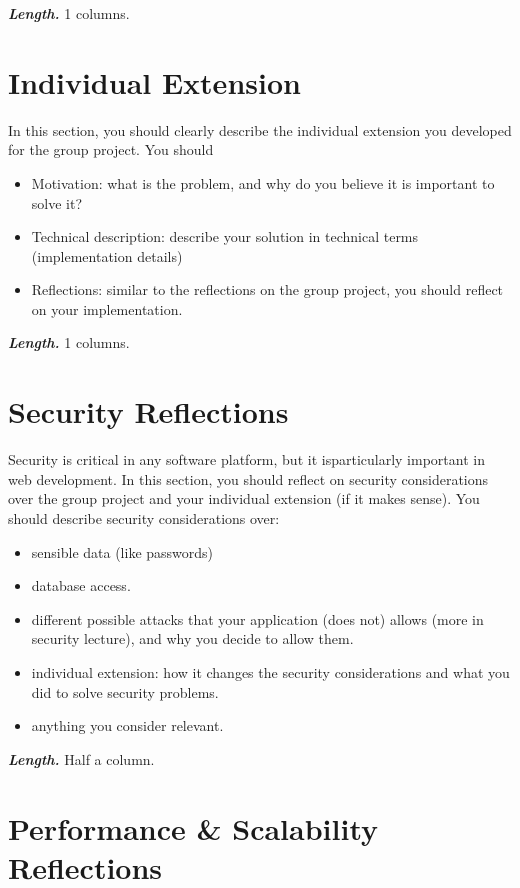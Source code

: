 \documentclass[letterpaper,twocolumn]{article}
\newcommand{\myparagraph}[1]{\vspace{0.1cm}\noindent \textbf{\textit{#1.}}}
\begin{document}
\myparagraph{Length} 1 columns.

\section{Individual Extension}
In this section, you should clearly describe the individual extension you developed for the group project. 
You should
\begin{itemize}
    \item Motivation: what is the problem, and why do you believe it is important to solve it?
    \item Technical description: describe your solution in technical terms (implementation details)
    \item Reflections: similar to the reflections on the group project, you should reflect on your implementation.
\end{itemize}

\myparagraph{Length} 1 columns.

\section{Security Reflections}
Security is critical in any software platform, but it isparticularly important in web development. 
In this section, you should reflect on security considerations over the group project and your individual extension (if it makes sense). 
You should describe security considerations over:

\begin{itemize}
    \item sensible data (like passwords)
    \item database access.
    \item different possible attacks that your application (does not) allows (more in security lecture), and why you decide to allow them.
    \item individual extension: how it changes the security considerations and what you did to solve security problems.
    \item anything you consider relevant.
  \end{itemize}

\myparagraph{Length} Half a column.

\section{Performance & Scalability Reflections}
\end{document}
